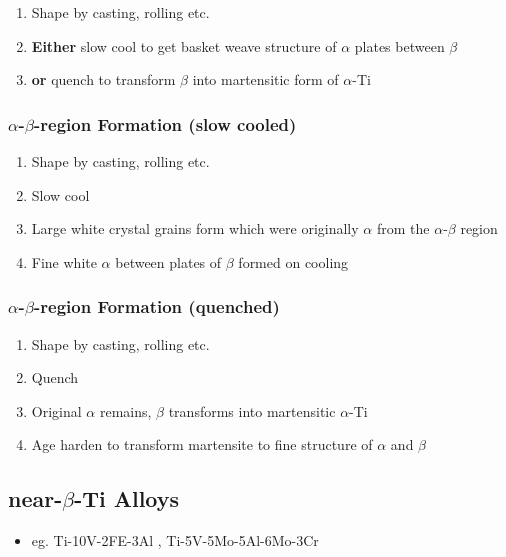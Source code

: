 \begin{enumerate}
  \item Shape by casting, rolling etc.
  \item \textbf{Either} slow cool to get basket weave structure of $\alpha$ plates between $\beta$
  \item \textbf{or} quench to transform $\beta$ into martensitic form of $\alpha$-Ti
\end{enumerate}


\subsubsection{$\alpha$-$\beta$-region Formation (slow cooled)} %
\label{ssub:subsubsection_name}

\begin{enumerate}
  \item Shape by casting, rolling etc.
  \item Slow cool
  \item Large white crystal grains form which were originally $\alpha$  from the $\alpha$-$
  \beta$ region
  \item Fine white $\alpha$ between plates of $\beta$ formed on cooling
\end{enumerate}


\subsubsection{$\alpha$-$\beta$-region Formation (quenched)} %
\label{ssub:subsubsection_name}

\begin{enumerate}
  \item Shape by casting, rolling etc.
  \item Quench
  \item Original $\alpha$ remains, $\beta$ transforms into martensitic $\alpha$-Ti
  \item Age harden to transform martensite to fine structure of $\alpha$ and $\beta$
\end{enumerate}


\subsection{near-$\beta$-Ti Alloys} %
\label{sub:}
\begin{itemize}
  \item eg. Ti-10V-2FE-3Al , Ti-5V-5Mo-5Al-6Mo-3Cr\end{itemize}

